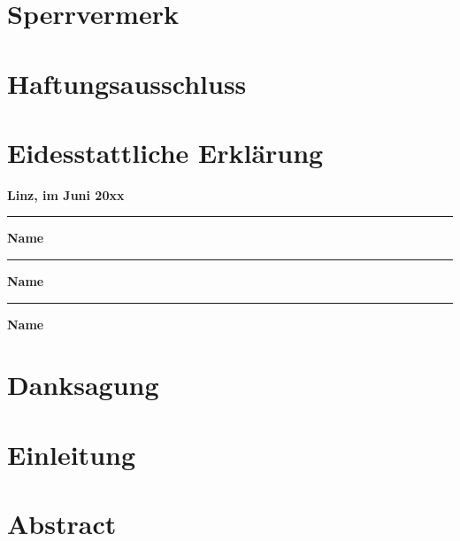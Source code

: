 \newcommand\signature[1]{%
\begin{center}\begin{minipage}{8cm}
    \centering
    \vspace{3cm}\par
    \rule{10cm}{0.5pt}\par
    \textbf{#1}\par
\end{minipage}\end{center}}

\section{Sperrvermerk}
\lipsum[1]

\vspace{2cm}

\section{Haftungsausschluss}
\lipsum[1]

\newpage

\section{Eidesstattliche Erklärung}
\lipsum[1]

\vspace{2cm}
\noindent
\textbf{Linz, im Juni 20xx}

\signature{Name}
\signature{Name}
\signature{Name}

\newpage

\section{Danksagung}
\lipsum[1]

\newpage

\section{Einleitung}
\lipsum[1]

\newpage

\section{Abstract}
\noindent
\lipsum[10]

